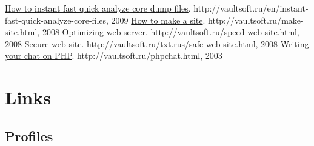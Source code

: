 \documentclass[10pt,a4paper]{moderncv}
\begin{document}
  \begin{thebibliography}{9}
    
      \bibitem{}
    \href{http://vaultsoft.ru/en/instant-fast-quick-analyze-core-files}{How to instant fast quick analyze core dump files}. http://vaultsoft.ru/en/instant-fast-quick-analyze-core-files, 2009
    \bibitem{}
    \href{http://vaultsoft.ru/make-site.html}{How to make a site}. http://vaultsoft.ru/make-site.html, 2008
    \bibitem{}
    \href{http://vaultsoft.ru/speed-web-site.html}{Optimizing web server}. http://vaultsoft.ru/speed-web-site.html, 2008
    \bibitem{}
    \href{http://vaultsoft.ru/txt.rus/safe-web-site.html}{Secure web-site}. http://vaultsoft.ru/txt.rus/safe-web-site.html, 2008
    \bibitem{}
    \href{http://vaultsoft.ru/phpchat.html}{Writing your chat on PHP}. http://vaultsoft.ru/phpchat.html, 2003
  
  \end{thebibliography}
    \section{Links}
    
        
    \subsection{Profiles}
        
    
  
\end{document}
